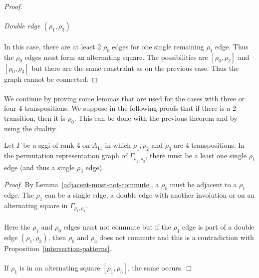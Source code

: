 \begin{proof}
  \paragraph{}
  \textit{Double edge $(\rho_1, \rho_3)$}

  \paragraph{}
  In this case, there are at least 2 $\rho_0$ edges for one single remaining $\rho_1$ edge. Thus the $\rho_0$ edges must form an alternating square. The possibilities are $[\rho_0, \rho_2]$ and $[\rho_0, \rho_3]$ but there are the same constraint as on the previous case. Thus the graph cannot be connected.

\end{proof}

\paragraph{}
We continue by proving some lemmas that are used for the cases with three or four 4-transpositions. We suppose in the following proofs that if there is a 2-transition, then it is $\rho_0$. This can be done with the previous theorem and by using the duality.

\begin{lemma}
  Let $\Gamma$ be a sggi of rank 4 on $A_{11}$ in which $\rho_1, \rho_2$ and $\rho_3$ are 4-transpositions. In the permutation representation graph of $\Gamma_{\rho_1, \rho_3}$, there must be a least one single $\rho_1$ edge (and thus a single $\rho_3$ edge).
\end{lemma}

\begin{proof}
  By Lemma~\ref{adjacent-must-not-commute}, a $\rho_0$ must be adjacent to a $\rho_1$ edge. The $\rho_1$ can be a single edge, a double edge with another involution or on an alternating square in $\Gamma_{\rho_1, \rho_3}$.

  \paragraph{}
  Here the $\rho_1$ and $\rho_0$ edges must not commute but if the $\rho_1$ edge is part of a double edge $(\rho_1, \rho_3)$, then $\rho_0$ and $\rho_3$ does not commute and this is a contradiction with Proposition~\ref{intersection-patterns}.

  \paragraph{}
  If $\rho_1$ is in an alternating square $[\rho_1, \rho_3]$, the same occurs.

\end{proof}

